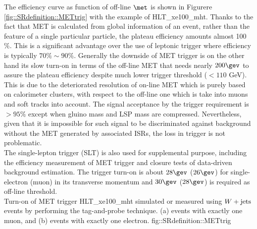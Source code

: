 The efficiency curve as function of off-line $\met$ is shown in Figurere \ref{fig::SRdefinition::METtrig} with the example of HLT\_xe100\_mht.
Thanks to the fact that MET is calculated from global information of an event, rather than the feature of a single particular particle, the plateau efficiency amounts almost 100 $\%$. 
This is a significant advantage over the use of leptonic trigger where efficiency is typically $70\% \sim 90\%$. 
Generally the downside of MET trigger is on the other hand its slow turn-on in terms of the off-line MET that needs nearly $200 \gev$ to assure the plateau efficiency despite much lower trigger threshold ($<110$ GeV). This is due to the deteriorated resolution of on-line MET which is purely based on calorimeter clusters, with respect to the off-line one which is take into muons and soft tracks into account. The signal acceptance by the trigger requirement is  $>95\%$ except when gluino mass and LSP mass are compressed. Nevertheless, given that it is impossible for such signal to be discriminated against background without the MET generated by associated ISRs, the loss in trigger is not problematic. \\


The single-lepton trigger (SLT) is also used for supplemental purpose, including the efficiency measurement of MET trigger and closure tests of data-driven background estimation. The trigger turn-on is about $28\gev$ ($26\gev$) for single-electron (muon) in its transverse momentum and $30\gev$ ($28\gev$) is required as off-line threshold. \\


{Turn-on of MET trigger HLT\_xe100\_mht simulated or measured using $W+\mathrm{jets}$ events by performing the tag-and-probe technique. (a) events with exactly one muon, and (b) events with exactly one electron.}
{fig::SRdefinition::METtrig}








